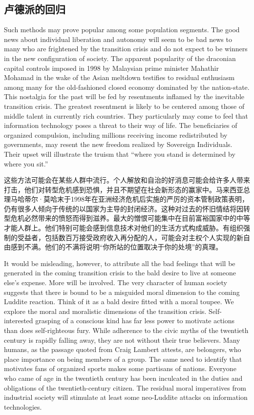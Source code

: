\begin{Parallel}{97mm}{45mm}
\section{卢德派的回归}   
  \ParallelLText
  {Such methods may prove popular among some population segments. The good news about individual liberation and autonomy will seem to be bad news to many who are frightened by the transition crisis and do not expect to be winners in the new configuration of society. The apparent popularity of the draconian capital controls imposed in 1998 by Malaysian prime minister Mahathir Mohamad in the wake of the Asian meltdown testifies to residual enthusiasm among many for the old-fashioned closed economy dominated by the nation-state. This nostalgia for the past will be fed by resentments inflamed by the inevitable transition crisis. The greatest resentment is likely to be centered among those of middle talent in currently rich countries. They particularly may come to feel that information technology poses a threat to their way of life. The beneficiaries of organized compulsion, including millions receiving income redistributed by governments, may resent the new freedom realized by Sovereign Individuals. Their upset will illustrate the truism that “where you stand is determined by where you sit.” }
  
  \ParallelRText
  {\small 这些方法可能会在某些人群中流行。个人解放和自治的好消息可能会给许多人带来打击，他们对转型危机感到恐惧，并且不期望在社会新形态的赢家中。马来西亚总理马哈蒂尔·莫哈末于1998年在亚洲经济危机后实施的严厉的资本管制政策表明，仍有很多人倾向于传统的以国家为主导的封闭经济。这种对过去的怀旧情结将因转型危机必然带来的愤怒而得到滋养。最大的憎恨可能集中在目前富裕国家中的中等才能人群上。他们特别可能会感到信息技术对他们的生活方式构成威胁。有组织强制的受益者，包括数百万接受政府收入再分配的人，可能会对主权个人实现的新自由感到不满。他们的不满将说明“你所站的位置取决于你的处境”的真理。}
\ParallelPar  

  \ParallelLText
  {It would be misleading, however, to attribute all the bad feelings that will be generated in the coming transition crisis to the bald desire to live at someone else's expense. More will be involved. The very character of human society suggests that there is bound to be a misguided moral dimension to the coming Luddite reaction. Think of it as a bald desire fitted with a moral toupee. We explore the moral and moralistic dimensions of the transition crisis. Self-interested grasping of a conscious kind has far less power to motivate actions than does self-righteous fury. While adherence to the civic myths of the twentieth century is rapidly falling away, they are not without their true believers. Many humans, as the passage quoted from Craig Lambert attests, are belongers, who place importance on being members of a group. The same need to identify that motivates fans of organized sports makes some partisans of nations. Everyone who came of age in the twentieth century has been inculcated in the duties and obligations of the twentieth-century citizen. The residual moral imperatives from industrial society will stimulate at least some neo-Luddite attacks on information technologies.  }
  

\end{Parallel}
